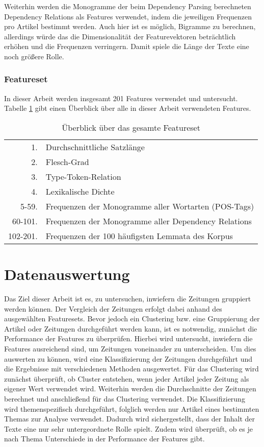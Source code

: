 Weiterhin werden die Monogramme der beim Dependency Parsing berechneten Dependency Relations als Features verwendet, indem die jeweiligen Frequenzen pro Artikel bestimmt werden. Auch hier ist es möglich, Bigramme zu berechnen, allerdings würde das die Dimensionalität der Featurevektoren beträchtlich erhöhen und die Frequenzen verringern. Damit spiele die Länge der Texte eine noch größere Rolle.

\clearpage
\subsection{Featureset}
In dieser Arbeit werden insgesamt 201 Features verwendet und untersucht. Tabelle \ref{table.allfeatures} gibt einen Überblick über alle in dieser Arbeit verwendeten Features.

\begin{table}[h]
\centering
\begin{spacing}{1.25}
\begin{tabular}{rl}
  1. & Durchschnittliche Satzlänge\\
  2. & Flesch-Grad\\
  3. & Type-Token-Relation\\
  4. & Lexikalische Dichte\\
  5-59. & Frequenzen der Monogramme aller Wortarten (POS-Tags)\\
  60-101. & Frequenzen der Monogramme aller Dependency Relations\\
  102-201. & Frequenzen der 100 häufigsten Lemmata des Korpus
\end{tabular}
\caption{Überblick über das gesamte Featureset}
\label{table.allfeatures}
\end{spacing}
\end{table}

\chapter{Datenauswertung}
Das Ziel dieser Arbeit ist es, zu untersuchen, inwiefern die Zeitungen gruppiert werden können. Der Vergleich der Zeitungen erfolgt dabei anhand des ausgewählten Featuresets. Bevor jedoch ein Clustering bzw. eine Gruppierung der Artikel oder Zeitungen durchgeführt werden kann, ist es notwendig, zunächst die Performance der Features zu überprüfen. Hierbei wird untersucht, inwiefern die Features ausreichend sind, um Zeitungen voneinander zu unterscheiden. Um dies auswerten zu können, wird eine Klassifizierung der Zeitungen durchgeführt und die Ergebnisse mit verschiedenen Methoden ausgewertet. Für das Clustering wird zunächst überprüft, ob Cluster entstehen, wenn jeder Artikel jeder Zeitung als eigener Wert verwendet wird. Weiterhin werden die Durchschnitte der Zeitungen berechnet und anschließend für das Clustering verwendet. Die Klassifizierung wird themenspezifisch durchgeführt, folglich werden nur Artikel eines bestimmten Themas zur Analyse verwendet. Dadurch wird sichergestellt, dass der Inhalt der Texte eine nur sehr untergeordnete Rolle spielt. Zudem wird überprüft, ob es je nach Thema Unterschiede in der Performance der Features gibt.

